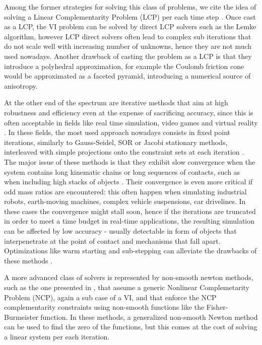 \documentclass[AMA,STIX1COL]{WileyNJD-v2}
\begin{document}
Among the former strategies for solving this class of problems, we cite the idea of solving a Linear Complementarity Problem (LCP) per each time step
\cite{StTr95}  %
.
Once cast as a LCP, the VI problem can be solved by direct LCP solvers such as the Lemke algorithm, however LCP direct solvers often lead to complex sub iterations that do not scale well with increasing number of unknowns, hence they are not much used nowadays. Another drawback of casting the problem as a LCP is that they introduce a polyhedral approximation, for example the Coulomb friction cone would be approximated as a faceted pyramid, introducing a numerical source of anisotropy. 

At the other end of the spectrum are iterative methods that aim at high robustness and efficiency even at the expense of sacrificing accuracy, since this is often acceptable in fields like real time simulation, video games and virtual reality \cite{Bender2014}.
In these fields, the most used approach nowadays consists in fixed point iterations, similarly to Gauss-Seidel, SOR or Jacobi stationary methods, interleaved with simple projections onto the constraint sets at each iteration
\cite{anitescuTasora2008,massSplittingRichard2012,AleMihaiFriction2013} %
.
The major issue of these methods is that they exhibit slow convergence when the system contains long kinematic chains or long sequences of contacts, such as when including high stacks of objects \cite{TasoraAnitescuCMAME10}. Their convergence is even more critical if odd mass ratios are encountered: this often happen when simulating industrial robots, earth-moving machines, complex vehicle suspensions, car drivelines. In these cases the convergence might stall soon, hence if the iterations are truncated in order to meet a time budget in real-time applications, the resulting simulation can be affected by low accuracy - usually detectable in form of objects that interpenetrate at the point of contact and mechanisms that fall apart. Optimizations like warm starting and sub-stepping can alleviate the drawbacks of these methods \cite{Macklin2019a}.

A more advanced class of solvers is represented by non-smooth newton methods, such as the one presented in 
\cite{Macklin2019} %
, that assume a generic Nonlinear Complemetarity Problem (NCP), again a sub case of a VI, and that enforce the NCP complementarity constraints using non-smooth functions like the Fisher-Burmeister function. In these methods, a generalized non-smooth Newton method can be used to find the zero of the functions, but this comes at the cost of solving a linear system per each iteration.
\end{document}
